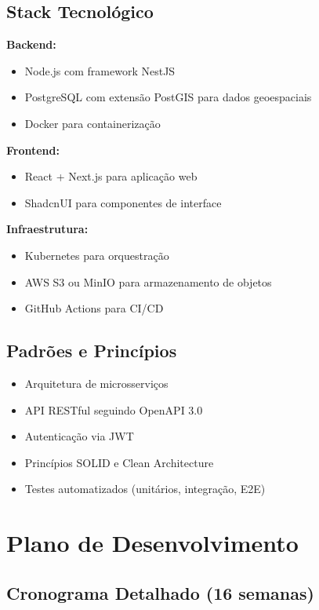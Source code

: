 \documentclass[12pt,a4paper]{article}
\begin{document}
\subsection{Stack Tecnológico}

\textbf{Backend:}
\begin{itemize}
    \item Node.js com framework NestJS
    \item PostgreSQL com extensão PostGIS para dados geoespaciais
    \item Docker para containerização
\end{itemize}

\textbf{Frontend:}
\begin{itemize}
    \item React + Next.js para aplicação web
    \item ShadcnUI para componentes de interface
\end{itemize}

\textbf{Infraestrutura:}
\begin{itemize}
    \item Kubernetes para orquestração
    \item AWS S3 ou MinIO para armazenamento de objetos
    \item GitHub Actions para CI/CD
\end{itemize}

\subsection{Padrões e Princípios}

\begin{itemize}
    \item Arquitetura de microsserviços
    \item API RESTful seguindo OpenAPI 3.0
    \item Autenticação via JWT
    \item Princípios SOLID e Clean Architecture
    \item Testes automatizados (unitários, integração, E2E)
\end{itemize}

\section{Plano de Desenvolvimento}
\label{sec:desenvolvimento}

\subsection{Cronograma Detalhado (16 semanas)}
\end{document}
